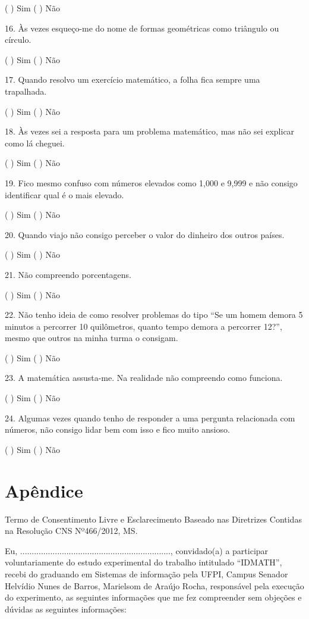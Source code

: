 \documentclass[
	12pt,				%
    oneside,			%
	a4paper,			%
	english,			%
	french,				%
	spanish,			%
	brazil,				%
	]{abntex2}
\begin{document}
\begin{apendicesenv}
( ) Sim
( ) Não


16.	Às vezes esqueço-me do nome de formas geométricas como triângulo ou círculo.


( ) Sim
( ) Não


17.	Quando resolvo um exercício matemático, a folha fica sempre uma trapalhada.


( ) Sim
( ) Não


18.	Às vezes sei a resposta para um problema matemático, mas não sei explicar como lá cheguei.


( ) Sim
( ) Não


19.	Fico mesmo confuso com números elevados como 1,000 e 9,999 e não consigo identificar qual é o mais elevado.


( ) Sim
( ) Não


20.	Quando viajo não consigo perceber o valor do dinheiro dos outros países.


( ) Sim
( ) Não


21.	Não compreendo porcentagens.


( ) Sim
( ) Não


22.	 Não tenho ideia de como resolver problemas do tipo “Se um homem demora 5 minutos a percorrer 10 quilômetros, quanto tempo demora a percorrer 12?”, mesmo que outros na minha turma o consigam.


( ) Sim
( ) Não


23.	A matemática assusta-me. Na realidade não compreendo como funciona.


( ) Sim
( ) Não


24.	Algumas vezes quando tenho de responder a uma pergunta relacionada com números, não consigo lidar bem com isso e fico muito ansioso.


( ) Sim
( ) Não


\chapter{Apêndice}

Termo de Consentimento Livre e Esclarecimento
Baseado nas Diretrizes Contidas na Resolução CNS Nº466/2012, MS.

Eu, ................................................................., convidado(a) a participar voluntariamente do estudo experimental do trabalho intitulado “IDMATH”, recebi do graduando em Sistemas de informação pela UFPI, Campus Senador Helvídio Nunes de Barros, Marielsom de Araújo Rocha, responsável pela execução do experimento, as seguintes informações que me fez compreender sem objeções e dúvidas as seguintes informações:



\end{apendicesenv}
\end{document}
